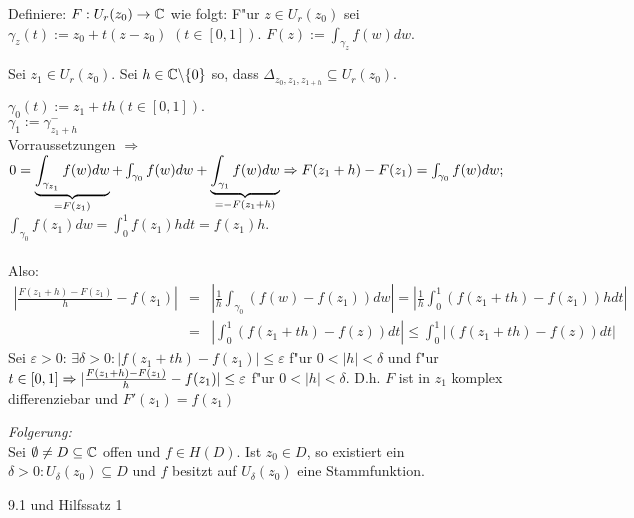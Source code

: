 \documentclass[a4paper,twoside,DIV15,BCOR12mm]{scrbook}
\begin{document}
\begin{beweis}
Definiere: $F: U_r(z_0) \rightarrow \mathbb{C}$ wie folgt:
F"ur $z \in U_r(z_0)$ sei $\gamma_z(t) := z_0 + t(z-z_0) $ $(t \in [0,1]). $ $ F(z) := \int_{\gamma_z} f(w)dw$.

Sei $z_1 \in U_r(z_0)$. Sei $h \in \mathbb{C} \backslash\{0\}$ so, dass $\Delta_{z_0,z_1,z_{1+h}} \subseteq U_r(z_0)$.

$\gamma_0(t) := z_1 + th (t \in [0,1]).$\\
$\gamma_1 := \gamma_{z_1+h}^-$\\
Vorraussetzungen   $\Rightarrow$ $ 0 = \underbrace{\int_{\gamma_{z_1}}f(w)dw}_{=F(z_1)} +
\int_{\gamma_0} f(w)dw + \underbrace{\int_{\gamma_1}f(w)dw}_{=-F(z_1+h)} \Rightarrow F(z_1+h) - F(z_1) \\ 
= \int_{\gamma_0} f(w)dw;$\\
$\int_{\gamma_0}f(z_1)dw = \int_0^1 f(z_1)hdt = f(z_1)h.$\\ \\
Also:
\begin{eqnarray}\nonumber
\left| \frac{F(z_1+h) - F(z_1)}h - f(z_1) \right|&=&\left| \frac1h \int_{\gamma_0}
(f(w)-f(z_1))dw \right| = \left| \frac1h \int_0^1(f(z_1+th)-f(z_1))h dt \right|\\\nonumber 
&=& \left| \int_0^1(f(z_1+th) - f(z))dt \right| \leq \int_0^1 \left|(f(z_1+th) - f(z))dt \right|
\end{eqnarray}
Sei $\varepsilon > 0: \,\exists \delta > 0: |f(z_1+th) - f(z_1)| \leq \varepsilon$ f"ur $0 < |h| < \delta$ und f"ur $t \in [0,1] \Rightarrow \\ | \frac{F(z_1+h) - F(z_1)}h - f(z_1)| \leq \varepsilon$ f"ur $0 < |h| < \delta$. D.h. $F$ ist in $z_1$ komplex differenziebar und $F'(z_1) = f(z_1)$
\end{beweis}



\emph{Folgerung:}\\
Sei $\emptyset \not= D \subseteq \mathbb{C}$ offen und $f \in H(D)$. Ist $z_0 \in D$, so existiert ein $\delta > 0: U_{\delta}(z_0) \subseteq D$ und $f$ besitzt auf $U_{\delta}(z_0)$ eine Stammfunktion.\\

\begin{beweis}
9.1 und Hilfssatz 1
\end{beweis}


\end{document}
